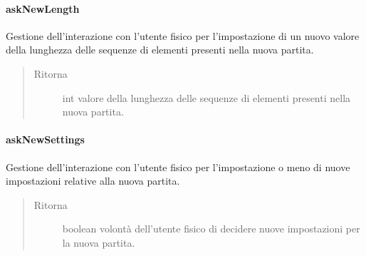 \documentclass[letterpaper,10pt,italian,openany,oneside]{sphinxmanual}
\begin{document}
\paragraph{askNewLength}
\label{\detokenize{source/it/unicam/cs/pa/mastermind/ui/StartView:asknewlength}}

\begin{fulllineitems}
\label{\detokenize{source/it/unicam/cs/pa/mastermind/ui/StartView:it.unicam.cs.pa.mastermind.ui.StartView.askNewLength()}}
Gestione dell’interazione con l’utente fisico per l’impostazione di un nuovo valore della lunghezza delle sequenze di elementi presenti nella nuova partita.
\begin{quote}\begin{description}
\item[{Ritorna}] \leavevmode
int valore della lunghezza delle sequenze di elementi presenti nella nuova partita.

\end{description}\end{quote}

\end{fulllineitems}



\paragraph{askNewSettings}
\label{\detokenize{source/it/unicam/cs/pa/mastermind/ui/StartView:asknewsettings}}

\begin{fulllineitems}
\label{\detokenize{source/it/unicam/cs/pa/mastermind/ui/StartView:it.unicam.cs.pa.mastermind.ui.StartView.askNewSettings()}}
Gestione dell’interazione con l’utente fisico per l’impostazione o meno di nuove impostazioni relative alla nuova partita.
\begin{quote}\begin{description}
\item[{Ritorna}] \leavevmode
boolean volontà dell’utente fisico di decidere nuove impostazioni per la nuova partita.

\end{description}\end{quote}

\end{fulllineitems}
\end{document}
